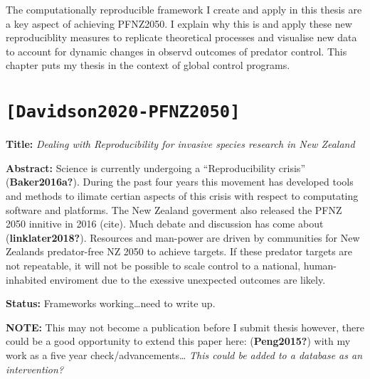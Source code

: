 The computationally reproducible framework I create and apply in this thesis are a key aspect of achieving PFNZ2050. I explain why this is and apply these new reproduciblity measures to replicate theoretical processes and visualise new data to account for dynamic changes in observd outcomes of predator control. This chapter puts my thesis in the context of global control programs.

\hypertarget{davidson2020-pfnz2050}{%
\section{\texorpdfstring{\texttt{{[}Davidson2020-PFNZ2050{]}}}{{[}Davidson2020-PFNZ2050{]}}}\label{davidson2020-pfnz2050}}

\textbf{Title:} \emph{Dealing with Reproducibility for invasive species research in New Zealand}

\textbf{Abstract:} Science is currently undergoing a ``Reproducibility crisis'' (\textbf{Baker2016a?}). During the past four years this movement has developed tools and methods to ilimate certian aspects of this crisis with respect to computating software and platforms. The New Zealand goverment also released the PFNZ 2050 innitive in 2016 (cite). Much debate and discussion has come about (\textbf{linklater2018?}). Resources and man-power are driven by communities for New Zealands predator-free NZ 2050 to achieve targets. If these predator targets are not repeatable, it will not be possible to scale control to a national, human-inhabited enviroment due to the exessive unexpected outcomes are likely.

\textbf{Status:} Frameworks working\ldots need to write up.

\textbf{NOTE:} This may not become a publication before I submit thesis however, there could be a good opportunity to extend this paper here: (\textbf{Peng2015?}) with my work as a five year check/advancements\ldots{} \emph{This could be added to a database as an intervention?}

